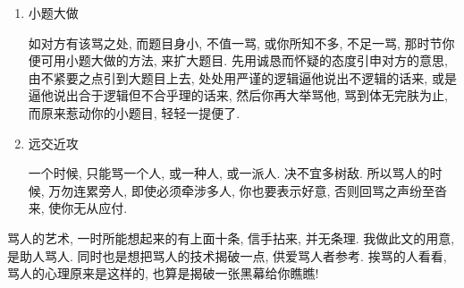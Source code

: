 \begin{enumerate}
\item 小题大做

\hspace{1.8em}如对方有该骂之处, 而题目身小, 不值一骂, 或你所知不多, 不足一骂, 那时节你便可用小题大做的方法, 来扩大题目. 先用诚恳而怀疑的态度引申对方的意思, 由不紧要之点引到大题目上去, 处处用严谨的逻辑逼他说出不逻辑的话来, 或是逼他说出合于逻辑但不合乎理的话来, 然后你再大举骂他, 骂到体无完肤为止, 而原来惹动你的小题目, 轻轻一提便了. 

\item 远交近攻

\hspace{1.8em}一个时候, 只能骂一个人, 或一种人, 或一派人. 决不宜多树敌. 所以骂人的时候, 万勿连累旁人, 即使必须牵涉多人, 你也要表示好意, 否则回骂之声纷至沓来, 使你无从应付. 

\end{enumerate}

\hspace{1.8em}骂人的艺术, 一时所能想起来的有上面十条, 信手拈来, 并无条理. 我做此文的用意, 是助人骂人. 同时也是想把骂人的技术揭破一点, 供爱骂人者参考. 挨骂的人看看, 骂人的心理原来是这样的, 也算是揭破一张黑幕给你瞧瞧!
